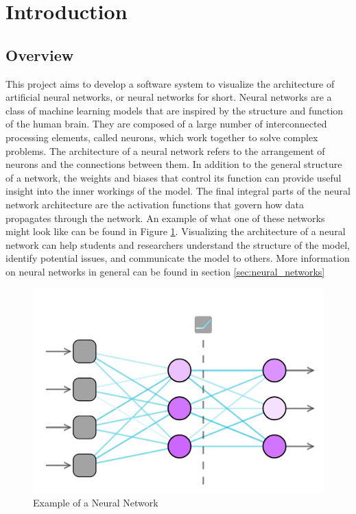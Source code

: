\section{Introduction}
\label{sec:Introduction}

\subsection{Overview} 
This project aims to develop a software system to visualize the architecture of artificial neural networks, or neural networks for short. Neural networks are a class of machine learning models that are inspired by the structure and function of the human brain. They are composed of a large number of interconnected processing elements, called neurons, which work together to solve complex problems. The architecture of a neural network refers to the arrangement of neurons and the connections between them. In addition to the general structure of a network, the weights and biases that control its function can provide useful insight into the inner workings of the model. The final integral parts of the neural network architecture are the activation functions that govern how data propagates through the network. An example of what one of these networks might look like can be found in Figure \ref{fig:neural_network}. Visualizing the architecture of a neural network can help students and researchers understand the structure of the model, identify potential issues, and communicate the model to others. More information on neural networks in general can be found in section \ref{sec:neural_networks}

\begin{figure}[!hb]
    \centering
    \includegraphics[width=1\textwidth]{01_introduction/res/neural_network.png}
    \caption{Example of a Neural Network}
    \label{fig:neural_network}
\end{figure}

